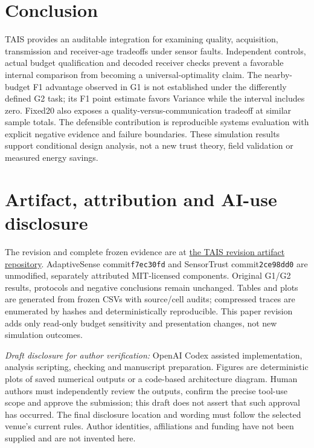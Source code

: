 \documentclass[10pt]{article}
\begin{document}
\section{Conclusion}
TAIS provides an auditable integration for examining quality, acquisition, transmission and receiver-age tradeoffs under sensor faults. Independent controls, actual budget qualification and decoded receiver checks prevent a favorable internal comparison from becoming a universal-optimality claim. The nearby-budget F1 advantage observed in G1 is not established under the differently defined G2 task; its F1 point estimate favors Variance while the interval includes zero. Fixed20 also exposes a quality-versus-communication tradeoff at similar sample totals. The defensible contribution is reproducible systems evaluation with explicit negative evidence and failure boundaries. These simulation results support conditional design analysis, not a new trust theory, field validation or measured energy savings.

\section*{Artifact, attribution and AI-use disclosure}
The revision and complete frozen evidence are at \href{https://github.com/Sver0411/TAIS/tree/docs/tais-paper-major-revision}{the TAIS revision artifact repository}. AdaptiveSense commit\texttt{f7ec30fd} and SensorTrust commit\texttt{2ce98dd0} are unmodified, separately attributed MIT-licensed components. Original G1/G2 results, protocols and negative conclusions remain unchanged. Tables and plots are generated from frozen CSVs with source/cell audits; compressed traces are enumerated by hashes and deterministically reproducible. This paper revision adds only read-only budget sensitivity and presentation changes, not new simulation outcomes.

\textit{Draft disclosure for author verification:} OpenAI Codex assisted implementation, analysis scripting, checking and manuscript preparation. Figures are deterministic plots of saved numerical outputs or a code-based architecture diagram. Human authors must independently review the outputs, confirm the precise tool-use scope and approve the submission; this draft does not assert that such approval has occurred. The final disclosure location and wording must follow the selected venue's current rules. Author identities, affiliations and funding have not been supplied and are not invented here.


\clearpage
\appendix
\end{document}
